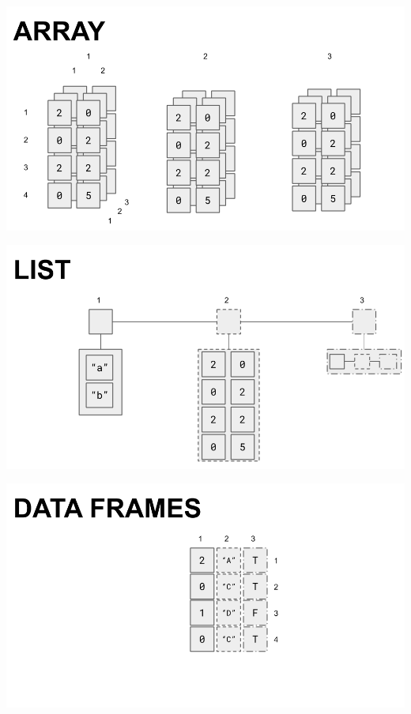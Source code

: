 \documentclass[
  ignorenonframetext,
]{beamer}
\begin{document}
\begin{frame}

\includegraphics{../external/images/ARRAY_4.png}

\end{frame}

\begin{frame}

\includegraphics{../external/images/LIST.png}

\end{frame}

\begin{frame}

\includegraphics{../external/images/DF.png}

\end{frame}
\end{document}
